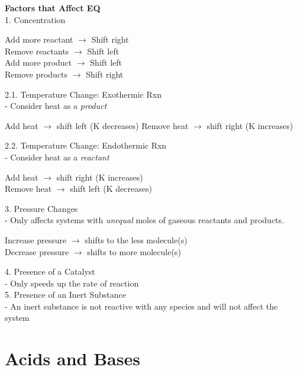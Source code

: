 \documentclass[11pt]{article}
\begin{document}
    \textbf{Factors that Affect EQ} \\
    1. Concentration 
    \begin{center}
        Add more reactant $\rightarrow$ Shift right \\
        Remove reactants $\rightarrow$ Shift left \\
        Add more product $\rightarrow$ Shift left \\
        Remove products $\rightarrow$ Shift right
    \end{center}
    2.1. Temperature Change: Exothermic Rxn \\
    - Consider heat as a \emph{product}
    \begin{center}
        Add heat $\rightarrow$ shift left (K decreases)
        Remove heat $\rightarrow$ shift right (K increases)
    \end{center}
    2.2. Temperature Change: Endothermic Rxn \\
     - Consider heat as a \emph{reactant}
    \begin{center}
        Add heat $\rightarrow$ shift right (K increases) \\
        Remove heat $\rightarrow$ shift left (K decreases)
    \end{center}
    3. Pressure Changes \\
    - Only affects systems with \emph{unequal} moles of gaseous reactants and products.
    \begin{center}
        Increase pressure $\rightarrow$ shifts to the less molecule(s) \\
        Decrease pressure $\rightarrow$ shifts to more molecule(s)
    \end{center}
    4. Presence of a Catalyst \\
    - Only speeds up the rate of reaction \\
    5. Presence of an Inert Substance \\
    - An inert substance is not reactive with any species and will not affect the system

    \section{Acids and Bases}
\end{document}

